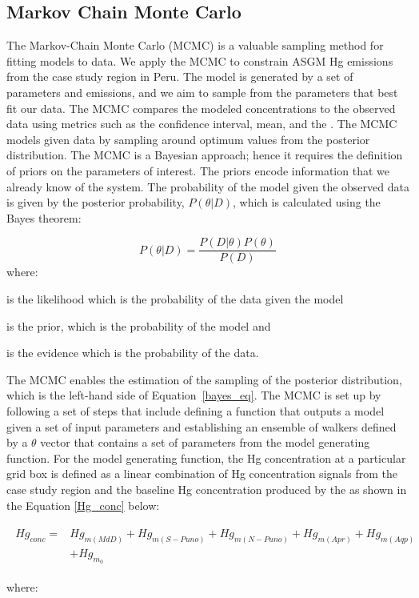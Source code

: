 \subsection{Markov Chain Monte Carlo}

\begin{flushleft}
The Markov-Chain Monte Carlo (MCMC) is a valuable sampling method for fitting models to data\cite{hogg_data_2018}. We apply the MCMC to constrain ASGM Hg emissions from the case study region in Peru.  The model is generated by a set of parameters and emissions, and we aim to sample from the parameters that best fit our data. The MCMC compares the modeled concentrations to the observed data using metrics such as the \nft confidence interval, mean, and the \iq. The MCMC models given data by sampling around optimum values from the posterior distribution. The MCMC is a Bayesian approach; hence it requires the definition of priors on the parameters of interest. The priors encode information that we already know of the system. The probability of the model given the observed data is given by the posterior probability, $P(\theta|D)$, which is calculated using the Bayes theorem:

\begin{equation}
\label{bayes_eq}
P(\theta|D)=\frac{P(D|\theta)P(\theta)}{P(D)}
\end{equation}
where:
\end{flushleft}

\begin{description}[leftmargin=!,labelwidth={3 em}]
    \item [$P(D|\theta)$] is the likelihood which is the probability of the data given the model
    \item [$P(\theta)$] is the prior, which is the probability of the model and 
    \item [$P(D)$] is the evidence which is the probability of the data.
\end{description}

\begin{flushleft}
The MCMC enables the estimation of the sampling of the posterior distribution, which is the left-hand side of Equation~\ref{bayes_eq}. The MCMC is set up by following a set of steps that include defining a function that outputs a model given a set of input parameters and establishing an ensemble of walkers defined by a $\theta$ vector that contains a set of parameters from the model generating function. For the model generating function, the Hg concentration at a particular grid box is defined as a linear combination of Hg concentration signals from the case study region and the baseline Hg concentration produced by the \on as shown in the Equation \ref{Hg_conc} below:

\begin{align}
\begin{split}\label{Hg_conc}
Hg_{conc}= {}&Hg_{m(MdD)}+ Hg_{m(S-Puno)} + Hg_{m(N-Puno)} + Hg_{m(Apr)}+ Hg_{m(Aqp)}\\
            & +Hg_{m_0}
\end{split}
\end{align}

where:
\end{flushleft}

